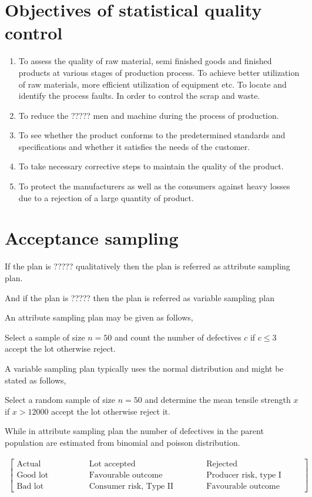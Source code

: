 \documentclass[oneside,11pt,pdftex]{book}%
\numberwithin{equation}{section}
\numberwithin{section}{chapter}
\numberwithin{equation}{chapter}
\begin{document}
\section{Objectives of statistical quality control}
\begin{enumerate}
	\item To assess the quality of raw material, semi finished goods and finished products at various stages of production process. To achieve better utilization of raw materials, more efficient utilization of equipment etc. To locate and identify the process faults. In order to control the scrap and waste.
	\item  To reduce the ????? men and machine during the process of production.
	\item To see whether the product conforms to the predetermined standards and specifications and whether it satisfies the needs of the customer.
	\item To take necessary corrective steps to maintain the quality of the product.
	\item To protect the manufacturers as well as the consumers against heavy losses due to a rejection of a large quantity of product.
\end{enumerate}

\section{Acceptance sampling}
If the plan is ????? qualitatively then the plan is referred as attribute sampling plan.

And if the plan is ????? then the plan is referred as variable sampling plan

An attribute sampling plan may be given as follows,

Select a sample of size $ n=50 $ and count the number of defectives $ c $ if $ c \leq 3 $ accept the lot otherwise reject.

A variable sampling plan typically uses the normal distribution and might be stated as follows,

Select a random sample of size $ n =50$ and determine the mean tensile strength $ x $ if $ x>12000 $ accept the lot otherwise reject it.

While in attribute sampling plan the number of defectives in the parent population are estimated from binomial and poisson distribution.

\begin{align*}
	\begin{bmatrix}
		\text{Actual condition} && \text{Lot accepted} && \text{Rejected}\\
		\text{Good lot} && \text{Favourable outcome} && \text{Producer risk, type I error}\\
		\text{Bad lot} && \text{Consumer risk, Type II Error} && \text{Favourable outcome}
	\end{bmatrix}
\end{align*}
\end{document}
